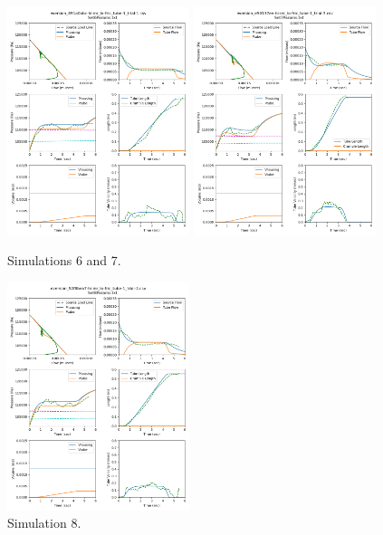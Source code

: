 \documentclass[letterpaper]{article}
\begin{document}
\begin{figure}\centering
\includegraphics[width=0.475\textwidth]{Set6result27-Jul.png}
\includegraphics[width=0.475\textwidth]{Set7result27-Jul.png}
\caption{Simulations 6 and 7.}
\end{figure}



\begin{figure}\centering
\includegraphics[width=0.475\textwidth]{Set8result27-Jul.png}
\caption{Simulation 8.}
\end{figure}



\end{document}
